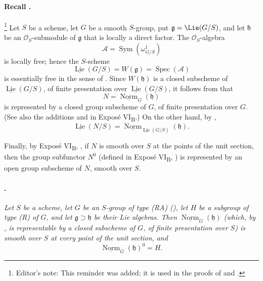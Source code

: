 \paragraph{Recall .}
\footnote{Editor's note: This reminder was added; it is used in the
proofs of  and .} Let \(S\) be a scheme, let \(G\) be a
smooth \(S\)-group, put \(\mathfrak g=\Lie(G/S)\), and let
\(\mathfrak h\) be an \(\mathcal O_S\)-submodule of \(\mathfrak g\)
that is locally a direct factor. The \(\mathcal O_S\)-algebra
\[
  \mathscr A=\operatorname{Sym}(\omega^1_{G/S})
\]
is locally free; hence the \(S\)-scheme
\[
  \underline{\operatorname{Lie}}(G/S)
  =
  W(\mathfrak g)
  =
  \operatorname{Spec}(\mathscr A)
\]
is essentially free in the sense of . Since
\(W(\mathfrak h)\) is a closed subscheme of
\(\underline{\operatorname{Lie}}(G/S)\), of finite presentation
over \(\underline{\operatorname{Lie}}(G/S)\), it follows from
 \textup{} that
\[
  N=\underline{\operatorname{Norm}}_G(\mathfrak h)
\]
is represented by a closed group subscheme of \(G\), of finite
presentation over \(G\). (See also the additions  and 
\textup{} in Exposé VI\textsubscript{B}.) On the other hand, by
,
\[
  \underline{\operatorname{Lie}}(N/S)
  =
  \underline{\operatorname{Norm}}_
    {\underline{\operatorname{Lie}}(G/S)}(\mathfrak h).
\]

Finally, by Exposé VI\textsubscript{B}, , if \(N\) is smooth
over \(S\) at the points of the unit section, then the group
subfunctor \(N^0\) (defined in Exposé VI\textsubscript{B}, ) is
represented by an open group subscheme of \(N\), smooth over \(S\).

\paragraph{.}
\textit{Let \(S\) be a scheme, let \(G\) be an \(S\)-group of type
\textup{(RA)} \textup{()}, let \(H\) be a subgroup of type
\textup{(R)} of \(G\), and let
\(\mathfrak g\supset\mathfrak h\) be their Lie algebras. Then
\(\underline{\operatorname{Norm}}_G(\mathfrak h)\)
\textup{(which, by , is representable by a closed subscheme of
\(G\), of finite presentation over \(S\))} is smooth over \(S\) at
every point of the unit section, and}
\[
  \underline{\operatorname{Norm}}_G(\mathfrak h)^0=H.
\]

